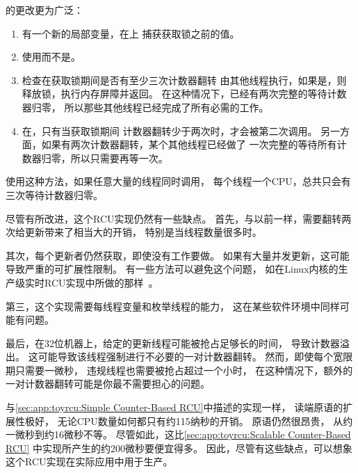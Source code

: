 \begin{listing}

\caption{使用每线程引用计数对的RCU共享更新}
\label{lst:app:toyrcu:RCU Shared Update Using Per-Thread Reference-Count Pair}
\end{listing}

\begin{fcvref}
的更改更为广泛：
\begin{enumerate}
\item	有一个新的局部变量，在上
	捕获获取锁之前的值。
\item	{}使用而不是。
\item	{}检查在获取锁期间是否有至少三次计数器翻转
	由其他线程执行，如果是，则释放锁，执行内存屏障并返回。
	在这种情况下，已经有两次完整的等待计数器归零，
	所以那些其他线程已经完成了所有必需的工作。
\item	在，只有当获取锁期间
	计数器翻转少于两次时，才会被第二次调用。
	另一方面，如果有两次计数器翻转，某个其他线程已经做了
	一次完整的等待所有计数器归零，所以只需要再等一次。
\end{enumerate}
\end{fcvref}

使用这种方法，如果任意大量的线程同时调用，
每个线程一个CPU，总共只会有三次等待计数器归零。

尽管有所改进，这个RCU实现仍然有一些缺点。
首先，与以前一样，需要翻转两次给更新带来了相当大的开销，
特别是当线程数量很多时。

其次，每个更新者仍然获取，即使没有工作要做。
如果有大量并发更新，这可能导致严重的可扩展性限制。
有一些方法可以避免这个问题，
如在Linux内核的生产级实时RCU实现中所做的那样~\cite{PaulEMcKenney2007PreemptibleRCU}。

第三，这个实现需要每线程变量和枚举线程的能力，
这在某些软件环境中同样可能有问题。

最后，在32位机器上，给定的更新线程可能被抢占足够长的时间，
导致计数器溢出。
这可能导致该线程强制进行不必要的一对计数器翻转。
然而，即使每个宽限期只需要一微秒，
违规线程也需要被抢占超过一个小时，
在这种情况下，额外的一对计数器翻转可能是你最不需要担心的问题。

与\cref{sec:app:toyrcu:Simple Counter-Based RCU}中描述的实现一样，
读端原语的扩展性极好，
无论CPU数量如何都只有约115纳秒的开销。
原语仍然很昂贵，
从约一微秒到约16微秒不等。
尽管如此，这比\cref{sec:app:toyrcu:Scalable Counter-Based RCU}
中实现所产生的约200微秒要便宜得多。
因此，尽管有这些缺点，可以想象这个RCU实现在实际应用中用于生产。

